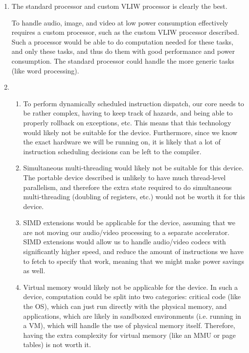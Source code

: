 



\begin{enumerate}[label=(\alph*)]

  \item
    The standard processor and custom VLIW processor is clearly the best.

    To handle audio, image, and video at low power consumption effectively requires a custom processor, such as the custom VLIW processor described. Such a processor would be able to do computation needed for these tasks, and only these tasks, and thus do them with good performance and power consumption. The standard processor could handle the more generic tasks (like word processing).

  \item
    \begin{enumerate}[label=(\roman*)]

      \item
        To perform dynamically scheduled instruction dispatch, our core needs to be rather complex, having to keep track of hazards, and being able to properly rollback on exceptions, etc. This means that this technology would likely not be suitable for the device. Furthermore, since we know the exact hardware we will be running on, it is likely that a lot of instruction scheduling decisions can be left to the compiler.

      \item
        Simultaneous multi-threading would likely not be suitable for this device. The portable device described is unlikely to have much thread-level parallelism, and therefore the extra state required to do simultaneous multi-threading (doubling of registers, etc.) would not be worth it for this device.

      \item
        SIMD extensions would be applicable for the device, assuming that we are not moving our audio/video processing to a separate accelerator. SIMD extensions would allow us to handle audio/video codecs with significantly higher speed, and reduce the amount of instructions we have to fetch to specify that work, meaning that we might make power savings as well.

      \item
        Virtual memory would likely not be applicable for the device. In such a device, computation could be split into two categories: critical code (like the OS), which can just run directly with the physical memory, and applications, which are likely in sandboxed environments (i.e. running in a VM), which will handle the use of physical memory itself. Therefore, having the extra complexity for virtual memory (like an MMU or page tables) is not worth it.


\end{enumerate}
\end{enumerate}
